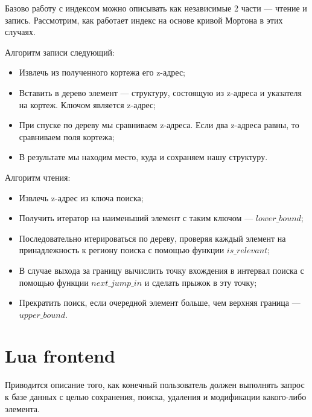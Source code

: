 Базово работу с индексом можно описывать как независимые 2 части --- чтение и запись.
Рассмотрим, как работает индекс на основе кривой Мортона
в этих случаях.

Алгоритм записи следующий:
\begin{itemize}
	\item Извлечь из полученного кортежа его z-адрес;
	\item Вставить в дерево элемент --- структуру, состоящую из z-адреса и указателя на кортеж. Ключом является z-адрес;
	\item При спуске по дереву мы сравниваем z-адреса. Если два z-адреса равны, то сравниваем поля кортежа;
	\item В результате мы находим место, куда и сохраняем нашу структуру. 
\end{itemize}

Алгоритм чтения:
\begin{itemize}
	\item Извлечь z-адрес из ключа поиска;
	\item Получить итератор на наименьший элемент с таким ключом --- $lower\_bound$;
	\item Последовательно итерироваться по дереву, проверяя каждый элемент на принадлежность к региону поиска с помощью функции $is\_relevant$;
	\item В случае выхода за границу вычислить точку вхождения в интервал поиска с помощью функции $next\_jump\_in$ и сделать прыжок в эту точку;
	\item Прекратить поиск, если очередной элемент больше,
	чем верхняя граница --- $upper\_bound$.
\end{itemize}

\section{Lua frontend}
Приводится описание того, как конечный пользователь должен выполнять
запрос к базе данных с целью сохранения, поиска, удаления и модификации
какого-либо элемента.

